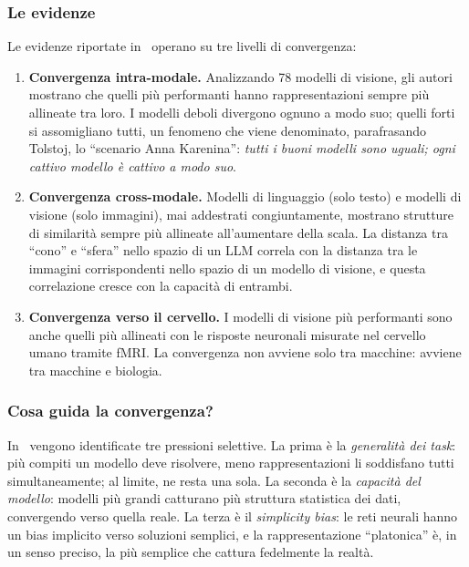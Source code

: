 \subsubsection{Le evidenze}
\label{subsubsec:evidenze}
Le evidenze riportate in~\parencite{huh2024platonic} operano su tre livelli di convergenza:

\begin{enumerate}
    \item \textbf{Convergenza intra-modale.} Analizzando 78 modelli di visione, gli autori mostrano che quelli più performanti hanno rappresentazioni sempre più allineate tra loro. I modelli deboli divergono ognuno a modo suo; quelli forti si assomigliano tutti, un fenomeno che viene denominato, parafrasando Tolstoj, lo ``scenario Anna Karenina'': \textit{tutti i buoni modelli sono uguali; ogni cattivo modello è cattivo a modo suo}.
    \item \textbf{Convergenza cross-modale.} Modelli di linguaggio (solo testo) e modelli di visione (solo immagini), mai addestrati congiuntamente, mostrano strutture di similarità sempre più allineate all'aumentare della scala. La distanza tra ``cono'' e ``sfera'' nello spazio di un LLM correla con la distanza tra le immagini corrispondenti nello spazio di un modello di visione, e questa correlazione cresce con la capacità di entrambi.
    \item \textbf{Convergenza verso il cervello.} I modelli di visione più performanti sono anche quelli più allineati con le risposte neuronali misurate nel cervello umano tramite fMRI. La convergenza non avviene solo tra macchine: avviene tra macchine e biologia.
\end{enumerate}

\subsubsection{Cosa guida la convergenza?}
\label{subsubsec:guida_convergenza}
In~\parencite{huh2024platonic} vengono identificate tre pressioni selettive. La prima è la \textit{generalità dei task}: più compiti un modello deve risolvere, meno rappresentazioni li soddisfano tutti simultaneamente; al limite, ne resta una sola. La seconda è la \textit{capacità del modello}: modelli più grandi catturano più struttura statistica dei dati, convergendo verso quella reale. La terza è il \textit{simplicity bias}: le reti neurali hanno un bias implicito verso soluzioni semplici, e la rappresentazione ``platonica'' è, in un senso preciso, la più semplice che cattura fedelmente la realtà.
